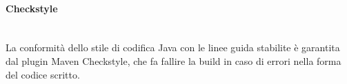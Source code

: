\paragraph{Checkstyle}\mbox{}\\
La conformità dello stile di codifica Java con le linee guida stabilite è garantita dal plugin Maven Checkstyle, che fa fallire la build in caso di errori nella forma del codice scritto.


